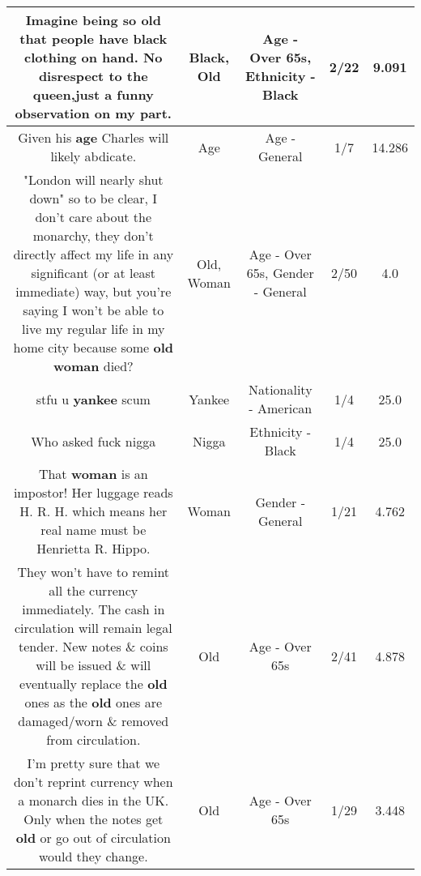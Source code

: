 \documentclass[11pt]{article}
\newlength\mylength
\begin{document}
\begin{center}
\begin{longtable}{|C{.65\mylength}|C{.30\mylength}|C{.12\mylength}|C{.12\mylength}|C{.12\mylength}|}
  \small Imagine being so \textbf{old} that people have \textbf{black} clothing on hand. No disrespect to the queen,just a funny observation on my part.\normalsize   & Black, Old & Age - Over 65s, Ethnicity - Black & 2/22 & 9.091 \\  \hline
  \small Given his \textbf{age} Charles will likely abdicate.\normalsize   & Age & Age - General & 1/7 & 14.286 \\  \hline
  \small "London will nearly shut down" so to be clear, I don't care about the monarchy, they don't directly affect my life in any significant (or at least immediate) way, but you're saying I won't be able to live my regular life in my home city because some \textbf{old} \textbf{woman} died?\normalsize   & Old, Woman & Age - Over 65s, Gender - General & 2/50 & 4.0 \\  \hline
  \small stfu u \textbf{yankee} scum\normalsize   & Yankee & Nationality - American & 1/4 & 25.0 \\  \hline
  \small Who asked fuck nigga\normalsize   & Nigga & Ethnicity - Black & 1/4 & 25.0 \\  \hline
  \small That \textbf{woman} is an impostor! Her luggage reads H. R. H. which means her real name must be Henrietta R. Hippo.\normalsize   & Woman & Gender - General & 1/21 & 4.762 \\  \hline
  \small They won't have to remint all the currency immediately. The cash in circulation will remain legal tender. New notes \& coins will be issued \& will eventually replace the \textbf{old} ones as the \textbf{old} ones are damaged/worn \& removed from circulation.\normalsize   & Old & Age - Over 65s & 2/41 & 4.878 \\  \hline
  \small I'm pretty sure that we don't reprint currency when a monarch dies in the UK. Only when the notes get \textbf{old} or go out of circulation would they change.\normalsize   & Old & Age - Over 65s & 1/29 & 3.448 \\  \hline

\end{longtable}
\end{center}
\end{document}
